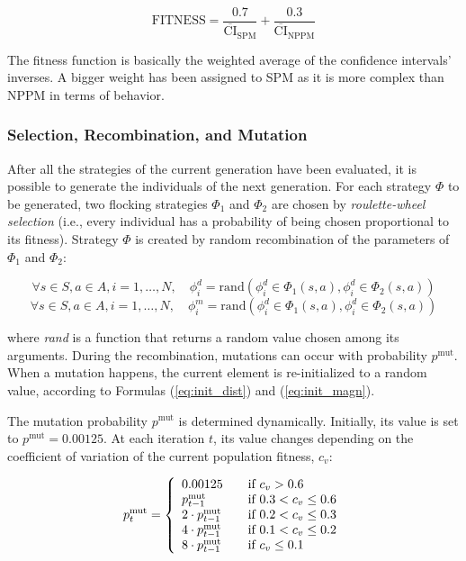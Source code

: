 \documentclass{llncs}
\begin{document}
$$\mathrm{FITNESS} = \frac{0.7}{\overline{\mathrm{CI}}_\mathrm{SPM}} + \frac{0.3}{\overline{\mathrm{CI}}_\mathrm{NPPM}}$$

The fitness function is basically the weighted average of the confidence intervals' inverses. A bigger weight has been assigned to SPM as it is more complex than NPPM in terms of behavior.

\subsubsection{Selection, Recombination, and Mutation}
\label{subsubsec:GA_Selection_Recombination_Mutation}

After all the strategies of the current generation have been evaluated, it is possible to generate the individuals of the next generation. For each strategy $\Phi$ to be generated, two flocking strategies $\Phi_1$ and $\Phi_2$ are chosen by \textit{roulette-wheel selection}  (i.e., every individual has a probability of being chosen proportional to its fitness). Strategy $\Phi$ is created by random recombination of the parameters of $\Phi_1$ and $\Phi_2$:

$$\forall s \in S, a \in A,  i = 1, \ldots, N, \quad \phi^d_i  = \mathrm{rand}(\phi^d_i \in \Phi_1(s,a), \phi^d_i \in \Phi_2(s,a))$$
$$\forall s \in S, a \in A,  i = 1, \ldots, N, \quad \phi^m_i = \mathrm{rand}(\phi^d_i \in \Phi_1(s,a), \phi^d_i \in \Phi_2(s,a))$$

where \textit{rand} is a function that returns a random value chosen among its arguments. During the recombination, mutations can occur with probability $p^\mathrm{mut}$. When a mutation happens, the current element is re-initialized to a random value, according to Formulas (\ref{eq:init_dist}) and (\ref{eq:init_magn}).

The mutation probability $p^\mathrm{mut}$ is determined dynamically. Initially, its value is set to $p^\mathrm{mut} = 0.00125$. At each iteration $t$, its value changes depending on the coefficient of variation of the current population fitness, $c_v$:

$$ p^\mathrm{mut}_t = \left\{
\begin{array}{l l}
	0.00125 & \quad \textrm{if $c_v > 0.6$}\\
	p^\mathrm{mut}_{t-1} & \quad \textrm {if $0.3 < c_v \leq 0.6$}\\
	2 \cdot p^\mathrm{mut}_{t-1} & \quad \textrm {if $0.2 < c_v \leq 0.3$}\\
	4 \cdot p^\mathrm{mut}_{t-1} & \quad \textrm {if $0.1 < c_v \leq 0.2$}\\
	8 \cdot p^\mathrm{mut}_{t-1} & \quad \textrm {if $c_v \leq 0.1$}\\
   \end{array} \right.$$
\end{document}
